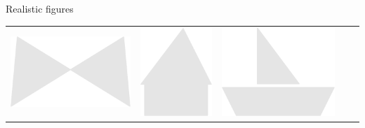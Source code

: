\documentclass[14pt]{beamer}
\begin{document}
\begin{frame}{Realistic figures}
\begin{center}
{\begin{tabular}{ccccc}
                \!\!\includegraphics[scale=0.20]{figures/figure026r.pdf}  \!\!&
                \!\!\includegraphics[scale=0.20]{figures/figure026ad.pdf} \!\!&
                \!\!\includegraphics[scale=0.20]{figures/figure026ae.pdf} \!\!\\

\end{tabular}}
\end{center}
\end{frame}
\end{document}
